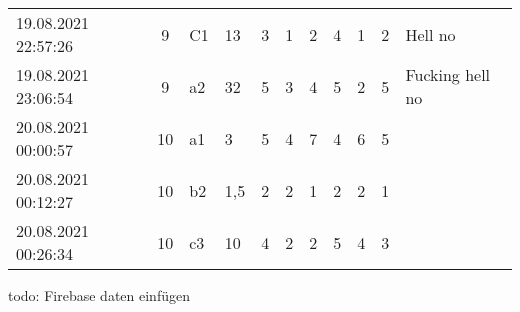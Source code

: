 \begin{landscape}
\begin{table}[]
\begin{tabular}{lcllccccccp{7cm}}
19.08.2021 22:57:26 & 9         & C1                & 13        & 3  & 1  & 2  & 4  & 1  & 2  & Hell no                                                   \\
19.08.2021 23:06:54 & 9         & a2                & 32        & 5  & 3  & 4  & 5  & 2  & 5  & Fucking hell no                                           \\
20.08.2021 00:00:57 & 10        & a1                & 3         & 5  & 4  & 7  & 4  & 6  & 5  &                                                           \\
20.08.2021 00:12:27 & 10        & b2                & 1,5       & 2  & 2  & 1  & 2  & 2  & 1  &                                                           \\
20.08.2021 00:26:34 & 10        & c3                & 10        & 4  & 2  & 2  & 5  & 4  & 3  &
\end{tabular}
\end{table}
\end{landscape}


todo: Firebase daten einfügen
